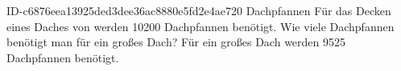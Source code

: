 \begin{exercise}
      {ID-c6876eea13925ded3dee36ac8880e5fd2e4ae720}
      {Dachpfannen}
  \ifproblem\problem
    Für das Decken eines Daches von  werden \num{10200} Dachpfannen benötigt.
    Wie viele Dachpfannen benötigt man für ein  großes Dach?
  \fi
  \ifoutcome\outcome
    Für ein  großes Dach werden \num{9525} Dachpfannen benötigt.
  \fi
\end{exercise}
